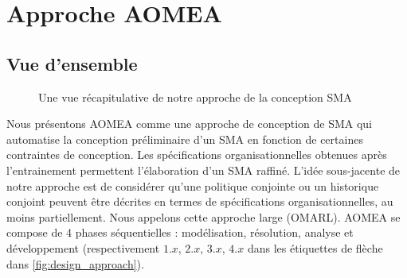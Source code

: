 \documentclass[contribution]{jfsma}
\begin{document}

\section{Approche AOMEA}



\subsection{Vue d'ensemble}

\begin{figure}[h!]
  \centering
  
  \caption{Une vue récapitulative de notre approche de la conception SMA}
  \label{fig:design_approach}
\end{figure}

Nous présentons AOMEA comme une approche de conception de SMA qui automatise la conception préliminaire d'un SMA en fonction de certaines contraintes de conception. Les spécifications organisationnelles obtenues après l'entrainement permettent l’élaboration d’un SMA raffiné.
L’idée sous-jacente de notre approche est de considérer qu’une politique conjointe ou un historique conjoint peuvent être décrites en termes de spécifications organisationnelles, au moins partiellement.
Nous appelons cette approche large  (OMARL).
%
%
AOMEA se compose de 4 phases séquentielles : modélisation, résolution, analyse et développement (respectivement $1.x$, $2.x$, $3.x$, $4.x$ dans les étiquettes de flèche dans \autoref{fig:design_approach}).
\end{document}
